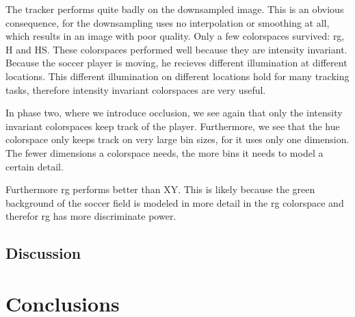 \documentclass[a4paper,11pt]{article}
\begin{document}
The tracker performs quite badly on the downsampled image. This is an obvious consequence, for  the downsampling uses no interpolation or smoothing at
all, which results in an image with poor quality. Only a few colorspaces
survived: rg, H and HS. These colorspaces performed well because they are
intensity invariant. Because the soccer player is moving, he recieves different
illumination at different locations. This different illumination on different
locations hold for many tracking tasks, therefore intensity
invariant colorspaces are very useful.

In phase two, where we introduce occlusion, we see again that only the intensity
invariant colorspaces keep track of the player. Furthermore, we see that the hue
colorspace only keeps track on very large bin sizes, for it uses
only one dimension. The fewer dimensions a colorspace needs, the more bins it
needs to model a certain detail.

Furthermore rg performs better than XY. This is likely because the green
background of the soccer field is modeled in more detail in the rg colorspace and
therefor rg has more discriminate power.


\subsection{Discussion} %
\section{Conclusions} \label{sec:conc}
\end{document}
